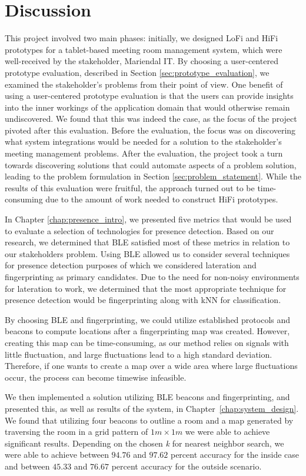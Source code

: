 \chapter{Discussion}\label{chap:discussion}
This project involved two main phases: initially, we designed LoFi and HiFi prototypes for a tablet-based meeting room management system, which were well-received by the stakeholder, Mariendal IT.
By choosing a user-centered prototype evaluation, described in Section \ref{sec:prototype_evaluation}, we examined the stakeholder's problems from their point of view.
One benefit of using a user-centered prototype evaluation is that the users can provide insights into the inner workings of the application domain that would otherwise remain undiscovered.
We found that this was indeed the case, as the focus of the project pivoted after this evaluation. 
Before the evaluation, the focus was on discovering what system integrations would be needed for a solution to the stakeholder's meeting management problems.
After the evaluation, the project took a turn towards discovering solutions that could automate aspects of a problem solution, leading to the problem formulation in Section \ref{sec:problem_statement}.
While the results of this evaluation were fruitful, the approach turned out to be time-consuming due to the amount of work needed to construct HiFi prototypes.

In Chapter \ref{chap:presence_intro}, we presented five metrics that would be used to evaluate a selection of technologies for presence detection.
Based on our research, we determined that BLE satisfied most of these metrics in relation to our stakeholders problem.
Using BLE allowed us to consider several techniques for presence detection purposes of which we considered lateration and fingerprinting as primary candidates.
Due to the need for non-noisy environments for lateration to work, we determined that the most appropriate technique for presence detection would be fingerprinting along with kNN for classification.

By choosing BLE and fingerprinting, we could utilize established protocols and beacons to compute locations after a fingerprinting map was created. 
However, creating this map can be time-consuming, as our method relies on signals with little fluctuation, and large fluctuations lead to a high standard deviation. 
Therefore, if one wants to create a map over a wide area where large fluctuations occur, the process can become timewise infeasible.

We then implemented a solution utilizing BLE beacons and fingerprinting, and presented this, as well as results of the system, in Chapter~\ref{chap:system_design}.
We found that utilizing four beacons to outline a room and a map generated by traversing the room in a grid pattern of $1m \times 1m$ we were able to achieve significant results.
Depending on the chosen \textit{k} for nearest neighbor search, we were able to achieve between $94.76$ and $97.62$ percent accuracy for the inside case and between $45.33$ and $76.67$ percent accuracy for the outside scenario. 

